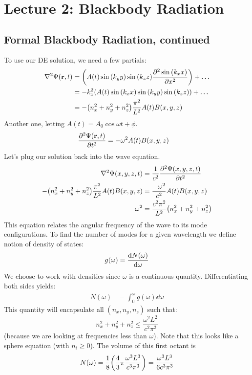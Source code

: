 \section{Lecture 2: Blackbody Radiation}

\subsection{Formal Blackbody Radiation, continued}

To use our DE solution, we need a few partials:
\begin{align*}
    \nabla^2 \Psi(\mbf{r}, t) &= \qty(A(t) \sin\qty(k_y y) \sin\qty(k_z z) \partialderivative{^2 \sin\qty(k_x x)}{x^2}) + \dots \\
    &= - k_x^2 (A(t) \sin\qty(k_x x) \sin\qty(k_y y) \sin\qty(k_z z))  + \dots \\
    &= - \qty(n_x^2 + n_y^2 + n_z^2) \frac{\pi^2}{L^2} A(t) B(x, y, z)
\end{align*}
Another one, letting $A(t) = A_0 \cos{\omega t + \phi}$.
\begin{align*}
    \partialderivative{^2 \Psi(\mbf{r}, t)}{t^2} &= - \omega^2 A(t) B(x, y, z)
\end{align*}
Let's plug our solution back into the wave equation.
\begin{align*}
    \nabla^2 \Psi(x, y, z, t) &= \frac{1}{c^2} \partialderivative{^2 \Psi(x, y, z, t)}{t^2} \\
    - \qty(n_x^2 + n_y^2 + n_z^2) \frac{\pi^2}{L^2} A(t) B(x, y, z) &= \frac{- \omega^2}{c^2} A(t) B(x, y, z) \\
    \omega^2 &= \frac{c^2 \pi^2}{L^2} \qty(n_x^2 + n_y^2 + n_z^2)
\end{align*}
This equation relates the angular frequency of the wave to its mode configurations. To find the number of modes for a given wavelength we define
notion of density of states:
\[ g(\omega) = \derivative{N(\omega)}{\omega} \]
We choose to work with densities since $\omega$ is a continuous quantity. Differentiating both sides yields:
\begin{align*}
    N(\omega) &= \int_{0}^{\omega} g(\omega) \dd{\omega}
\end{align*}
This quantity will encapsulate all $(n_x, n_y, n_z)$ such that:
\[ n_x^2 + n_y^2 + n_z^2 \leq \frac{\omega^2 L^2}{c^2 \pi^2} \]
(because we are looking at frequencies less than $\omega$). Note that this looks like
a sphere equation (with $n_i \geq 0$). The volume of this first octant is
\[ N(\omega) = \frac{1}{8} \qty(\frac{4}{3} \pi \frac{\omega^3 L^3}{c^3 \pi^3}) = \frac{\omega^3 L^3}{6 c^3 \pi^3} \]
